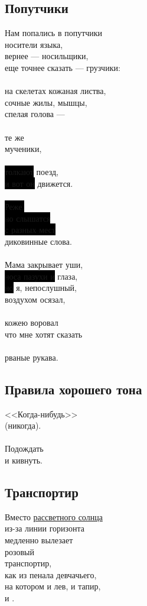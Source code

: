 \documentclass[12pt,a5paper]{report}
\newcommand{\hl}[1]{\colorbox{black}{#1}} %
\begin{document}
\subsection{Попутчики}

Нам попались в попутчики\\
носители языка,\\
вернее --- носильщики,\\
еще точнее сказать --- грузчики:\\
\\
на скелетах кожаная листва,\\
сочные жилы, мышцы,\\
спелая голова ---\\
\\
те же\\
мученики,\\
\\
\hl{толкают} поезд,\\
\hl{и вот он} движется.\\
\\
\hl{Реже,}\\
\hl{но слышатся}\\
\hl{с разных мест}\\
диковинные слова.\\
\\
Мама закрывает уши,\\
\hl{носа пазухи и} глаза,\\
\hl{но} я, непослушный,\\
воздухом осязал,\\
\\
кожею воровал\\
что мне хотят сказать\\
\\
рваные рукава.\\
\newpage


\subsection{Правила хорошего тона}

<<Когда-нибудь>>\\
(никогда).\\
\\
Подождать\\
и кивнуть.\\
\newpage

\subsection{Транспортир}
\label{transportir}
Вместо \hyperref[sosed3]{рассветного солнца}\\
из-за линии горизонта\\
медленно вылезает\\
розовый\\
транспортир,\\
как из пенала девчачьего,\\
на котором и лев, и тапир,\\
и \hl{\phantom{полоска полоска полоска}}.
\newpage
\end{document}
